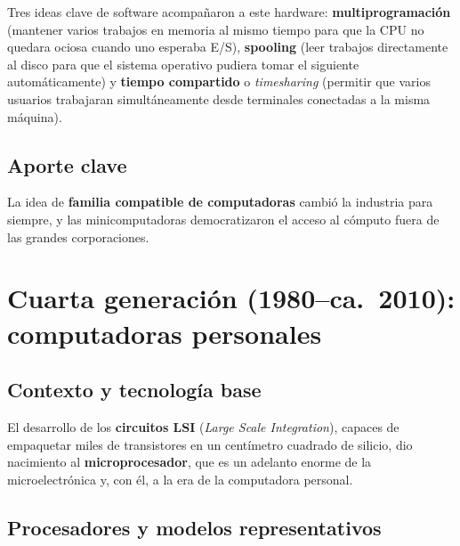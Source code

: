 \documentclass[10pt,letterpaper,twocolumn]{article}
\begin{document}
Tres ideas clave de software acompañaron a este hardware:
\textbf{multiprogramación} (mantener varios trabajos en memoria al mismo
tiempo para que la CPU no quedara ociosa cuando uno esperaba E/S),
\textbf{spooling} (leer trabajos directamente al disco para que el
sistema operativo pudiera tomar el siguiente automáticamente) y
\textbf{tiempo compartido} o \emph{timesharing} (permitir que varios
usuarios trabajaran simultáneamente desde terminales conectadas a la
misma máquina).

\subsection{Aporte clave}

La idea de \textbf{familia compatible de computadoras} cambió la
industria para siempre, y las minicomputadoras democratizaron el acceso
al cómputo fuera de las grandes corporaciones.

\section{Cuarta generación (1980--ca.~2010): computadoras personales}

\subsection{Contexto y tecnología base}

El desarrollo de los \textbf{circuitos LSI} (\emph{Large Scale
Integration}), capaces de empaquetar miles de transistores en un
centímetro cuadrado de silicio, dio nacimiento al
\textbf{microprocesador}, que es un adelanto enorme de la microelectrónica y, con 
él, a la era de la computadora personal.

\subsection{Procesadores y modelos representativos}
\end{document}
